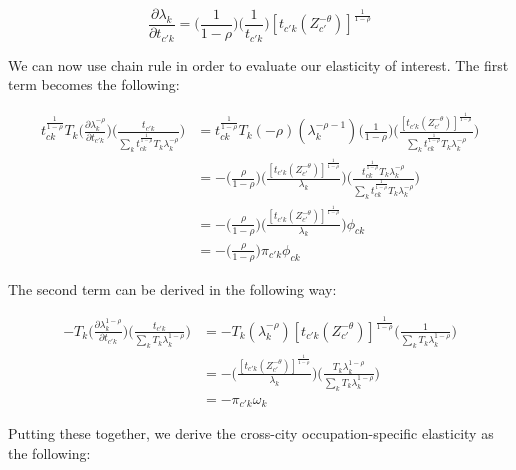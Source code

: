 \documentclass[10pt]{article}
\begin{document}
\begin{equation*}
    \frac{\partial{\lambda_{k}}}{\partial{t_{{c'}k}}} = \Big(\frac{1}{1-\rho}\Big)\Big(\frac{1}{t_{{c'}k}}\Big)[{t_{{c'}k}}(Z_{c'}^{-\theta})]^{\frac{1}{1-\rho}}
\end{equation*}

We can now use chain rule in order to evaluate our elasticity of interest. The first term becomes the following:

\begin{align*}
    {t^{\frac{1}{1-\rho}}_{ck}}{T_{k}}\Big(\frac{\partial\lambda_{k}^{-\rho}}{\partial{t_{{c'}k}}}\Big)\Big(\frac{t_{{c'}k}}{{\sum\limits_{k}{t^{\frac{1}{1-\rho}}_{ck}}{T_{k}}\lambda_{k}^{-\rho}}}\Big) & = {t^{\frac{1}{1-\rho}}_{ck}}{T_{k}}(-\rho)(\lambda_{k}^{-\rho-1})\Big(\frac{1}{1-\rho}\Big)\Bigg(\frac{[{t_{{c'}k}}(Z_{c'}^{-\theta})]^{\frac{1}{1-\rho}}}{{\sum\limits_{k}{t^{\frac{1}{1-\rho}}_{ck}}{T_{k}}\lambda_{k}^{-\rho}}}\Bigg) \\ &= -\Bigg(\frac{\rho}{1-\rho}\Bigg)\Bigg(\frac{[{t_{{c'}k}}(Z_{c'}^{-\theta})]^{\frac{1}{1-\rho}}}{\lambda_{k}}\Bigg)\Bigg(\frac{t^{\frac{1}{1-\rho}}_{ck}{T_{k}}{\lambda^{-\rho}_{k}}}{{\sum\limits_{k}{t^{\frac{1}{1-\rho}}_{ck}}{T_{k}}\lambda_{k}^{-\rho}}}\Bigg)\\ &= -\Bigg(\frac{\rho}{1-\rho}\Bigg)\Bigg(\frac{[{t_{{c'}k}}(Z_{c'}^{-\theta})]^{\frac{1}{1-\rho}}}{\lambda_{k}}\Bigg){\phi_{ck}}\\ &= -\Big(\frac{\rho}{1-\rho}\Big){\pi_{{c'}k}}{\phi_{ck}}
\end{align*}

The second term can be derived in the following way:

\begin{align*}
    - {T_{k}}\Big(\frac{\partial\lambda_{k}^{1-\rho}}{\partial{t_{{c'}k}}}\Big)\Big(\frac{t_{{c'}k}}{{\sum\limits_{k}{T_{k}}\lambda_{k}^{1-\rho}}}\Big) & = - {T_{k}}(\lambda_{k}^{-\rho})[{t_{{c'}k}}(Z_{c'}^{-\theta})]^{\frac{1}{1-\rho}}\Big(\frac{1}{{\sum\limits_{k}{T_{k}}\lambda_{k}^{1-\rho}}}\Big) \\ &= - \Bigg(\frac{[{t_{{c'}k}}(Z_{c'}^{-\theta})]^{\frac{1}{1-\rho}}}{\lambda_{k}}\Bigg)\Big(\frac{{T_{k}}{\lambda_{k}^{1-\rho}}}{{\sum\limits_{k} T_k \lambda_{k}^{1-\rho}}}\Big)\\ &= -\pi_{{c'}k}{\omega_{k}}
\end{align*}

Putting these together, we derive the cross-city occupation-specific elasticity as the following:
\end{document}
